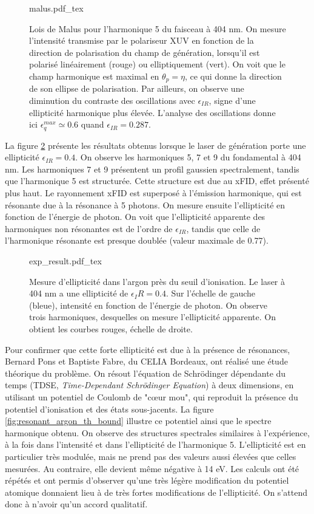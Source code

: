 \begin{figure}[!ht]
\centering
\def\svgwidth{0.7\columnwidth}
{malus.pdf_tex}
\caption{Lois de Malus pour l'harmonique 5 du faisceau à 404 nm. On mesure l'intensité transmise par le polariseur XUV en fonction de la direction de polarisation du champ de génération, lorsqu'il est polarisé linéairement (rouge) ou elliptiquement (vert). On voit que le champ harmonique est maximal en $\theta_p = \eta$, ce qui donne la direction de son ellipse de polarisation. Par ailleurs, on observe une diminution du contraste des oscillations avec $\epsilon_{IR}$, signe d'une ellipticité harmonique plus élevée. L'analyse des oscillations donne ici $\epsilon_q^{max} \simeq 0.6$ quand $\epsilon_{IR}=0.287$.}
\label{fig:malus}
\end{figure}

La figure \ref{fig:resonant_argon_exp} présente les résultats obtenus lorsque le laser de génération porte une ellipticité $\epsilon_{IR} = 0.4$. On observe les harmoniques 5, 7 et 9 du fondamental à 404 nm. Les harmoniques 7 et 9 présentent un profil gaussien spectralement, tandis que l'harmonique 5 est structurée. Cette structure est due au xFID, effet présenté plus haut. Le rayonnement xFID est superposé à l'émission harmonique, qui est résonante due à la résonance à 5 photons.  On mesure ensuite l'ellipticité en fonction de l'énergie de photon. On voit que l'ellipticité apparente des harmoniques non résonantes est de l'ordre de $\epsilon_{IR}$, tandis que celle de l'harmonique résonante est presque doublée (valeur maximale de 0.77).  

\begin{figure}[!ht]
\centering
\def\svgwidth{1\columnwidth}
{exp_result.pdf_tex}
\caption{Mesure d'ellipticité dans l'argon près du seuil d'ionisation. Le laser à 404 nm a une ellipticité de $\epsilon_IR=0.4$. Sur l'échelle de gauche (bleue), intensité en fonction de l'énergie de photon. On observe trois harmoniques, desquelles on mesure l'ellipticité apparente. On obtient les courbes rouges, échelle de droite.}
\label{fig:resonant_argon_exp}
\end{figure}

Pour confirmer que cette forte ellipticité est due à la présence de résonances, Bernard Pons et Baptiste Fabre, du CELIA Bordeaux, ont réalisé une étude théorique du problème. On résout l'équation de Schrödinger dépendante du temps (TDSE, \textit{Time-Dependant Schrödinger Equation}) à deux dimensions, en utilisant un potentiel de Coulomb de "cœur mou", qui reproduit la présence du potentiel d'ionisation et des états sous-jacents. La figure \ref{fig:resonant_argon_th_bound} illustre ce potentiel ainsi que le spectre harmonique obtenu. On observe des structures spectrales similaires à l'expérience, à la fois dans l'intensité et dans l'ellipticité de l'harmonique 5. L'ellipticité est en particulier très modulée, mais ne prend pas des valeurs aussi élevées que celles mesurées. Au contraire, elle devient même négative à 14 eV. Les calculs ont été répétés et ont permis d'observer qu'une très légère modification du potentiel atomique donnaient lieu à de très fortes modifications de l'ellipticité. On s'attend donc à n'avoir qu'un accord qualitatif.

